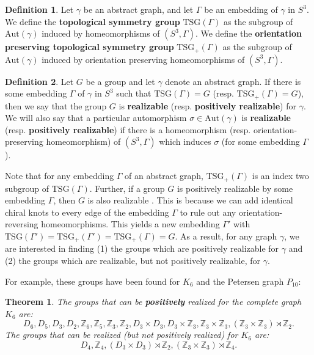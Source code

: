 \documentclass[11]{amsart}
\def\Z{\mathbb{Z}}
\newcommand{\semi}{{\rtimes}}
\def\TSG{{\mathrm{TSG}}}
\def\Aut{{\mathrm{Aut}}}
\newtheorem{theorem}{Theorem}[section]
\theoremstyle{definition}
\newtheorem*{definition}{Definition}
\theoremstyle{remark}
\begin{document}
\begin{definition}\label{def1.2} 
Let $\gamma$ be an abstract graph, and let $\Gamma$ be an embedding of $\gamma$ in $S^3$.  We define the {\bf topological symmetry group} $\TSG(\Gamma)$ as the subgroup of $\Aut(\gamma)$ induced by homeomorphisms of $(S^3,\Gamma)$.  We define the {\bf orientation preserving topological symmetry group} $\TSG_+(\Gamma)$ as the subgroup of $\Aut(\gamma)$ induced by orientation preserving homeomorphisms of $(S^3,\Gamma)$.  
\end{definition}

\begin{definition}\label{def1.4} Let  $G$ be a group and let $\gamma$ denote an abstract graph. If there is some embedding $\Gamma$ of $\gamma$ in $S^3$ such that $\TSG(\Gamma)=G$ (resp. $\TSG_+(\Gamma)=G$),  then we say that the group $G$ is {\bf realizable}  (resp. {\bf positively realizable}) for $\gamma$. We will also say that a particular automorphism $\sigma \in \Aut(\gamma)$ is {\bf realizable} (resp. {\bf positively realizable}) if there is a homeomorphism (resp. orientation-preserving homeomorphism) of $(S^3, \Gamma)$ which induces $\sigma$ (for some embedding $\Gamma$).
\end{definition}

Note that for any embedding $\Gamma$ of an abstract graph, $\TSG_+(\Gamma)$ is an index two subgroup of $\TSG(\Gamma)$.  Further, if a group $G$ is positively realizable by some embedding $\Gamma$, then $G$ is also realizable \cite{cf}. This is because we can add identical chiral knots to every edge of the embedding $\Gamma$ to rule out any orientation-reversing homeomorphisms.  This yields a new embedding $\Gamma'$ with $\TSG(\Gamma') = \TSG_+(\Gamma') = \TSG_+(\Gamma) = G$.  As a result, for any graph $\gamma$, we are interested in finding (1) the groups which are positively realizable for $\gamma$ and (2) the groups which are realizable, but not positively realizable, for $\gamma$.

For example, these groups have been found for $K_6$ and the Petersen graph $P_{10}$:

\begin{theorem} \cite{cf}
The groups that can be {\bf positively} realized for the complete graph $K_6$ are:
$$D_6, D_5, D_3, D_2, \Z_6, \Z_5, \Z_3, \Z_2, D_3 \times D_3, D_3 \times \Z_3, \Z_3 \times \Z_3, (\Z_3 \times \Z_3) \semi \Z_2.$$
The groups that can be realized (but not positively realized) for $K_6$ are:
$$D_4, \Z_4, (D_3 \times D_3) \semi \Z_2, (\Z_3 \times \Z_3) \semi \Z_4.$$
\end{theorem}
\end{document}
